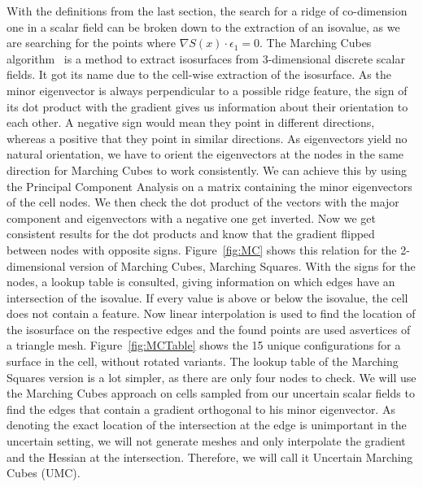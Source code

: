 With the definitions from the last section, the search for a ridge of
co-dimension one in a scalar field can be broken down to the extraction
of an isovalue, as we are searching for the points where $\nabla S(x)
\cdot \epsilon_1 = 0$. The Marching Cubes algorithm~\cite{MC} is a
method to extract isosurfaces from 3-dimensional discrete scalar fields.
It got its name due to the cell-wise extraction of the isosurface. As
the minor eigenvector is always perpendicular to a possible ridge
feature, the sign of its dot product with the gradient gives us
information about their orientation to each other. A negative sign would
mean they point in different directions, whereas a positive that they
point in similar directions. As eigenvectors yield no natural
orientation, we have to orient the eigenvectors at the nodes in the same
direction for Marching Cubes to work consistently. We can achieve this
by using the Principal Component Analysis on a matrix containing the
minor eigenvectors of the cell nodes. We then check the dot product of
the vectors with the major component and eigenvectors with a negative
one get inverted. Now we get consistent results for the dot products and
know that the gradient flipped between nodes with opposite signs.
Figure~\ref{fig:MC} shows this relation for the 2-dimensional version of
Marching Cubes, Marching Squares. With the signs for the nodes, a lookup
table is consulted, giving information on which edges have an
intersection of the isovalue. If every value is above or below the
isovalue, the cell does not contain a feature. Now linear interpolation
is used to find the location of the isosurface on the respective edges
and the found points are used asvertices of a triangle mesh.
Figure~\ref{fig:MCTable} shows the 15 unique configurations for a
surface in the cell, without rotated variants. The lookup table of the
Marching Squares version is a lot simpler, as there are only four nodes
to check. We will use the Marching Cubes approach on cells sampled from
our uncertain scalar fields to find the edges that contain a gradient
orthogonal to his minor eigenvector. As denoting the exact location of the
intersection at the edge is unimportant in the uncertain setting, we will
not generate meshes and only interpolate the gradient and the Hessian at
the intersection. Therefore, we will call it Uncertain Marching Cubes
(UMC).

